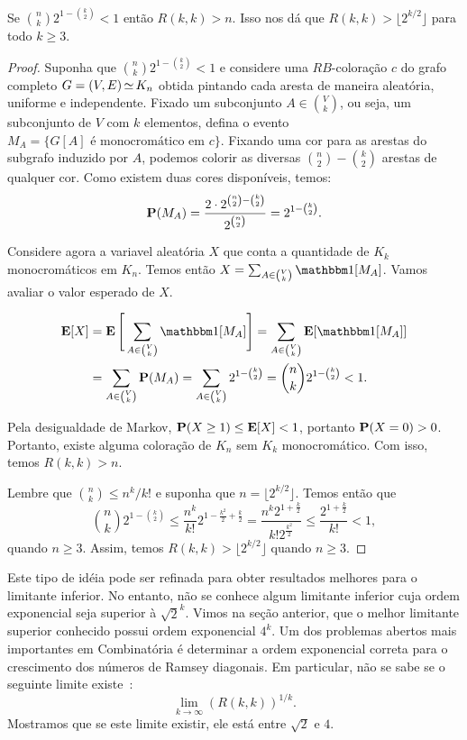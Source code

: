 \begin{theorem}[Erdös, 1947]
\label{thm:prob:method}
Se $\displaystyle \binom{n}{k} 2^{1 - \binom{k}{2}} < 1$ então $R(k,k) > n$. Isso nos dá que $R(k,k) > \lfloor 2^{k/2} \rfloor$ para todo $k \geq 3$.
\end{theorem}
\begin{proof}
Suponha que $\binom{n}{k} 2^{1 - \binom{k}{2}} < 1$ e considere uma $RB$-coloração $c$ do grafo completo $G = (V,E) \operatorname{\simeq} K_n$ obtida pintando cada aresta de maneira aleatória, uniforme e independente. Fixado um subconjunto $A \in \binom{V}{k}$, ou seja, um subconjunto de $V$ com $k$ elementos, defina o evento $M_A = \{G[A] \text{ é monocromático em } c\}$. Fixando uma cor para as arestas do subgrafo induzido por $A$, podemos colorir as diversas $\binom{n}{2} - \binom{k}{2}$ arestas de qualquer cor. Como existem duas cores disponíveis, temos:
\[ \operatorname{\mathbf{P}}(M_A) = \frac{2\cdot 2^{\binom{n}{2} - \binom{k}{2}}}{2^{\binom{n}{2}}}  = 2^{1 - \binom{k}{2}}. \]

Considere agora a variavel aleatória $X$ que conta a quantidade de $K_k$ monocromáticos em $K_n$. Temos então $X = \sum_{A \in \binom{V}{k}}\ind{M_A}$. Vamos avaliar o valor esperado de $X$.

\begin{align*}
\expec[X] &= \expec\Bigg[\sum_{A \in \binom{V}{k}}\ind{M_A} \Bigg] = \sum_{A \in \binom{V}{k}} \expec[\ind{M_A}] \\
&= \sum_{A \in \binom{V}{k}} \prob(M_A) = \sum_{A \in \binom{V}{k}} 2^{1 - \binom{k}{2}}  = \binom{n}{k} 2^{1 - \binom{k}{2}} < 1.
\end{align*}

Pela desigualdade de Markov, $\operatorname{\mathbf{P}}(X \geq 1) \leq \operatorname{\mathbf{E}}[X] < 1$, portanto $\operatorname{\mathbf{P}}(X = 0) > 0$. Portanto, existe alguma coloração de $K_n$ sem $K_k$ monocromático. Com isso, temos $R(k,k) > n$.

Lembre que $\binom{n}{k} \leq n^k /k!$ e suponha que $n = \lfloor 2^{k/2} \rfloor$. Temos então que
\[ \binom{n}{k}2^{1 - \binom{k}{2}} \leq \frac{n^k}{k!}2^{1 - \frac{k^2}{2} + \frac{k}{2}} = \frac{n^k 2^{1 + \frac{k}{2}}}{k!2^{\frac{k^2}{2}}} \leq \frac{2^{1 + \frac{k}{2}}}{k!} < 1, \]
quando $n \geq 3$. Assim, temos $R(k,k) > \lfloor 2^{k/2} \rfloor$ quando $n \geq 3$.
\end{proof}

Este tipo de idéia pode ser refinada para obter resultados melhores para o limitante inferior. No entanto, não se conhece algum limitante inferior cuja ordem exponencial seja superior à $\sqrt{2}^k$. Vimos na seção anterior, que o melhor limitante superior conhecido possui ordem exponencial $4^k$. Um dos problemas abertos mais importantes em Combinatória é determinar a ordem exponencial correta para o crescimento dos números de Ramsey diagonais. Em particular, não se sabe se o seguinte limite existe~\cite{chung1983survey}:
\[ \lim_{k \to \infty} \left(R(k,k)  \right)^{1/k}. \]
Mostramos que se este limite existir, ele está entre $\sqrt{2}$ e $4$.

